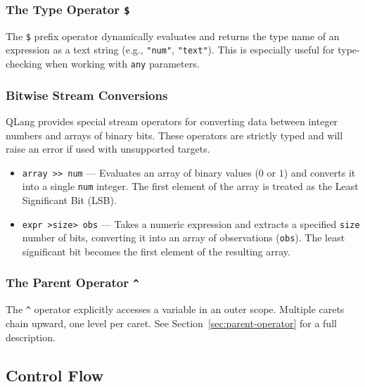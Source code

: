 \newpage
\subsubsection{The Type Operator \texttt{\$}}

The \texttt{\$} prefix operator dynamically evaluates and returns the type name of an 
expression as a text string (e.g., \texttt{"num"}, \texttt{"text"}). This is especially 
useful for type-checking when working with \texttt{any} parameters.



\subsubsection{Bitwise Stream Conversions}

QLang provides special stream operators for converting data between integer numbers and arrays of binary bits. These operators are strictly typed and will raise an error if used with unsupported targets.

\begin{itemize}
    \item \texttt{array >> num} — Evaluates an array of binary values ($0$ or $1$) and converts it into a single \texttt{num} integer. The first element of the array is treated as the Least Significant Bit (LSB).
    \item \texttt{expr >size> obs} — Takes a numeric expression and extracts a specified \texttt{size} number of bits, converting it into an array of observations (\texttt{obs}). The least significant bit becomes the first element of the resulting array.
\end{itemize}



\subsubsection{The Parent Operator \texttt{\^{}}}

The \texttt{\^{}} operator explicitly accesses a variable in an outer scope.
Multiple carets chain upward, one level per caret. See
Section~\ref{sec:parent-operator} for a full description.

\newpage
\subsection{Control Flow}\label{sec:control-flow}

